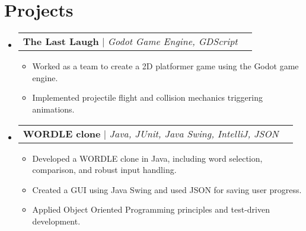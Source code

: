 \documentclass[letterpaper,11pt]{article}
\makeatletter
\newcommand{\resumeItem}[1]{
  \item\small{
    {#1 \vspace{-2pt}}
  }
}
\newcommand{\resumeSubheading}[4]{
  \vspace{-2pt}\item
    \begin{tabular*}{0.97\textwidth}[t]{l@{\extracolsep{\fill}}r}
      \textbf{#1} & #2 \\
      \textit{\small#3} & \textit{\small #4} \\
    \end{tabular*}\vspace{-7pt}
}
\newcommand{\resumeSubSubheading}[2]{
    \item
    \begin{tabular*}{0.97\textwidth}{l@{\extracolsep{\fill}}r}
      \textit{\small#1} & \textit{\small #2} \\
    \end{tabular*}\vspace{-7pt}
}
\newcommand{\resumeProjectHeading}[2]{
    \item
    \begin{tabular*}{0.97\textwidth}{l@{\extracolsep{\fill}}r}
      \small#1 & #2 \\
    \end{tabular*}\vspace{-7pt}
}
\newcommand{\resumeSubHeadingListStart}{\begin{itemize}[leftmargin=0.15in, label={}]}
\newcommand{\resumeSubHeadingListEnd}{\end{itemize}}
\newcommand{\resumeItemListStart}{\begin{itemize}}
\newcommand{\resumeItemListEnd}{\end{itemize}\vspace{-5pt}}
\makeatother
\begin{document}
    

      






\section{Projects}
    \resumeSubHeadingListStart
    \resumeProjectHeading
          {\textbf{The Last Laugh} $|$ \emph{Godot Game Engine, GDScript}}{}
          \resumeItemListStart
            \resumeItem{Worked as a team to create a 2D platformer game using the Godot game engine.}
            \resumeItem{Implemented projectile flight and collision mechanics triggering animations.}
          \resumeItemListEnd
      \resumeProjectHeading
          {\textbf{WORDLE clone} $|$ \emph{Java, JUnit, Java Swing, IntelliJ, JSON}}{}
          \resumeItemListStart
            \resumeItem{Developed a WORDLE clone in Java, including word selection, comparison, and robust input handling.}
            \resumeItem{Created a GUI using Java Swing and used JSON for saving user progress.}
            \resumeItem{Applied Object Oriented Programming principles and test-driven development.}

          \resumeItemListEnd

                  
      
    \resumeSubHeadingListEnd
\end{document}
